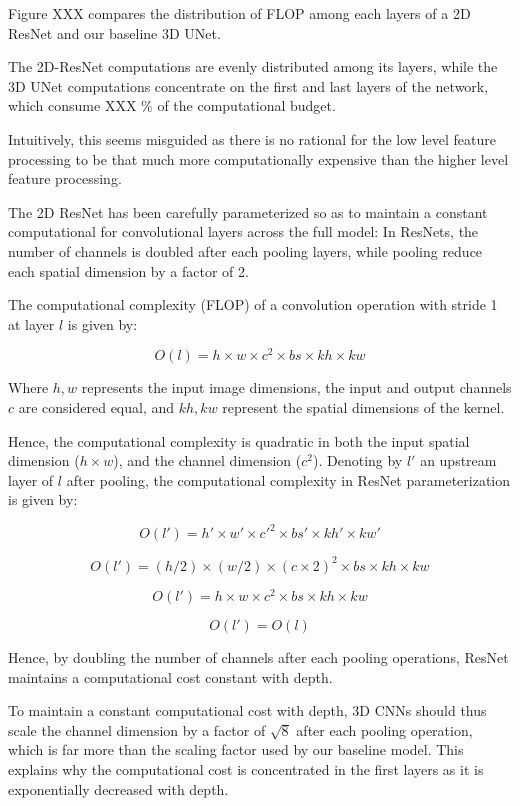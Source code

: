 \documentclass[runningheads]{llncs}
\begin{document}
Figure XXX compares the distribution of FLOP among each layers of a 2D ResNet \cite{} and our baseline 3D UNet.

The 2D-ResNet computations are evenly distributed among its layers, while the 3D UNet computations concentrate on the 
first and last layers of the network, which consume XXX \% of the computational budget.

Intuitively, this seems misguided as there is no rational for the low level feature processing to be that much more computationally 
expensive than the higher level feature processing.



The 2D ResNet has been carefully parameterized so as to maintain a constant computational 
for convolutional layers across the full model:
In ResNets, the number of channels is doubled after each pooling layers, 
while pooling reduce each spatial dimension by a factor of 2.

The computational complexity (FLOP) of a convolution operation with stride 1 at layer $l$ is given by:

$$ O(l) = h \times w \times c^2 \times bs  \times kh  \times kw $$

Where $h,w$ represents the input image dimensions, 
the input and output channels $c$ are considered equal, 
and $kh,kw$ represent the spatial dimensions of the kernel.



Hence, the computational complexity is quadratic in both the input spatial dimension ($h \times w$),
and the channel dimension ($c^2$).
Denoting by $l'$ an upstream layer of $l$ after pooling, the computational complexity in ResNet parameterization is given by:



$$ O(l') = h' \times w' \times c'^2 \times bs'  \times kh'  \times kw' $$

$$ O(l') = (h/2) \times (w/2) \times (c \times 2)^2 \times bs  \times kh  \times kw $$

$$ O(l') = h \times w \times c^2 \times bs  \times kh  \times kw $$

$$ O(l') = O(l) $$



Hence, by doubling the number of channels after each pooling operations, ResNet maintains a computational cost constant with depth.



To maintain a constant computational cost with depth, 3D CNNs should thus scale the channel dimension
by a factor of $\sqrt{8}$ after each pooling operation, 
which is far more than the scaling factor used by our baseline model.
This explains why the computational cost is concentrated in the first layers as 
it is exponentially decreased with depth.
\end{document}
